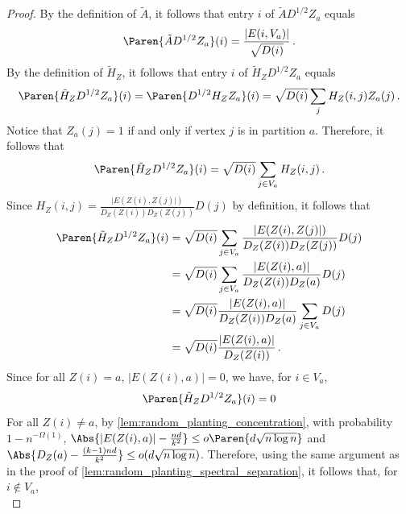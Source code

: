 \begin{proof}
    By the definition of $\tilde{A}$, it follows that entry $i$ of $\tilde{A} D^{1/2} Z_a$ equals
    \begin{equation}
        \label{eq:random_planting_subspace_inclusion_1}
        \Paren{\tilde{A} D^{1/2} Z_a}(i)
        = \frac{|E(i, V_a)|}{\sqrt{D(i)}} \,.
    \end{equation}
    By the definition of $\tilde{H}_Z$, it follows that entry $i$ of $\tilde{H}_Z  D^{1/2} Z_a$ equals
    \begin{equation*}
        \Paren{\tilde{H}_Z  D^{1/2} Z_a}(i)
        = \Paren{D^{1/2} H_Z Z_a}(i)
        = \sqrt{D(i)} \sum_{j} H_Z(i, j) Z_a(j) \,.
    \end{equation*}
    Notice that $Z_a(j) = 1$ if and only if vertex $j$ is in partition $a$. Therefore, it follows that
    \begin{equation*}
        \Paren{\tilde{H}_Z  D^{1/2} Z_a}(i)
        = \sqrt{D(i)} \sum_{j \in V_a} H_Z(i, j) \,.
    \end{equation*}
    Since $H_Z(i, j) = \frac{|E(Z(i), Z(j)|)}{D_Z(Z(i)) D_Z(Z(j))} D(j)$ by definition, it follows that
    \begin{align*}
        \Paren{\tilde{H}_Z  D^{1/2} Z_a}(i)
        & = \sqrt{D(i)} \sum_{j \in V_a} \frac{|E(Z(i), Z(j)|)}{D_Z(Z(i)) D_Z(Z(j))} D(j) \\
        & = \sqrt{D(i)} \sum_{j \in V_a} \frac{|E(Z(i), a)|}{D_Z(Z(i)) D_Z(a)} D(j) \\
        & = \sqrt{D(i)} \frac{|E(Z(i), a)|}{D_Z(Z(i)) D_Z(a)} \sum_{j \in V_a} D(j) \\
        & = \sqrt{D(i)} \frac{|E(Z(i), a)|}{D_Z(Z(i))} \,.
    \end{align*}
    Since for all $Z(i) = a$, $|E(Z(i), a)| = 0$, we have, for $i \in V_a$,
    \begin{equation}
    \label{eq:random_planting_subspace_inclusion_2}
        \Paren{\tilde{H}_Z  D^{1/2} Z_a}(i) = 0
    \end{equation}
    For all $Z(i) \neq a$, by \cref{lem:random_planting_concentration}, with probability $1-n^{-\Omega(1)}$, $\Abs{|E(Z(i), a)| - \frac{nd}{k^2}} \leq o \Paren{d \sqrt{n \log n}}$ and $\Abs{D_Z(a) - \frac{(k-1)nd}{k^2}} \leq o(d \sqrt{n \log n})$. Therefore, using the same argument as in the proof of \cref{lem:random_planting_spectral_separation}, it follows that, for $i \notin V_a$,
    \begin{equation}
    \label{eq:random_planting_subspace_inclusion_3}

\end{equation}
\end{proof}
